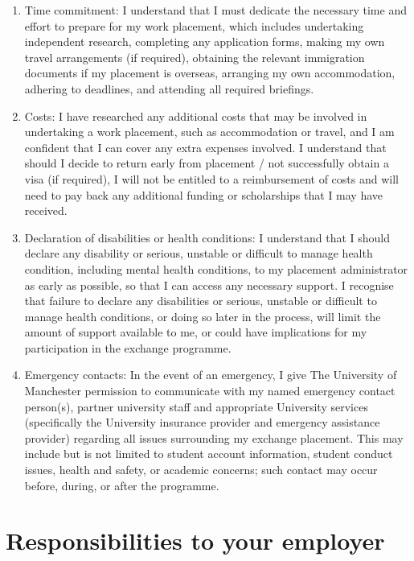 \documentclass[
]{book}
\providecommand{\tightlist}{%
  \setlength{\itemsep}{0pt}\setlength{\parskip}{0pt}}
\begin{document}
\begin{enumerate}
\def\labelenumi{\arabic{enumi}.}
\tightlist
\item
  Time commitment: I understand that I must dedicate the necessary time and effort to prepare for my work placement, which includes undertaking independent research, completing any application forms, making my own travel arrangements (if required), obtaining the relevant immigration documents if my
  placement is overseas, arranging my own accommodation, adhering to deadlines, and attending all required briefings.
\item
  Costs: I have researched any additional costs that may be involved in undertaking a work placement, such as accommodation or travel, and I am confident that I can cover any extra expenses involved. I understand that should I decide to return early from placement / not successfully obtain a visa (if required), I will not be entitled to a reimbursement of costs and will need to pay back any additional funding or scholarships that I may have received.
\item
  Declaration of disabilities or health conditions: I understand that I should declare any disability or serious, unstable or difficult to manage health condition, including mental health conditions, to my placement administrator as early as possible, so that I can access any necessary support. I recognise that failure to declare any disabilities or serious, unstable or difficult to manage health conditions, or doing so later in the process, will limit the amount of support available to me, or could have implications for my participation in the exchange programme.
\item
  Emergency contacts: In the event of an emergency, I give The University of Manchester permission to communicate with my named emergency contact person(s), partner university staff and appropriate University services (specifically the University insurance provider and emergency assistance provider) regarding all issues surrounding my exchange placement. This may include but is not limited to student account information, student conduct issues, health and safety, or academic concerns; such contact
  may occur before, during, or after the programme.
\end{enumerate}

\section{Responsibilities to your employer}\label{responsibilities-to-your-employer}
\end{document}
